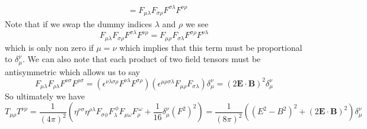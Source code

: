 \documentclass[11pt]{article}
\numberwithin{equation}{section}
\begin{document}
\begin{enumerate}[(a)]
\begin{align*}
                                                                                                             &= F_{\mu\lambda}F_{\sigma\rho}F^{\sigma\lambda}F^{\nu\rho}
    \end{align*}
    Note that if we swap the dummy indices $\lambda$ and $\rho$ we see
    $$F_{\mu\lambda}F_{\sigma\rho}F^{\sigma\lambda}F^{\nu\rho} = F_{\mu\rho}F_{\sigma\lambda}F^{\sigma\rho}F^{\nu\lambda}$$
    which is only non zero if $\mu=\nu$ which implies that this term must be proportional to $\delta^{\nu}_{\mu}$. We 
    can also note that each product of two field tensors must be antisymmetric which allows us to say
    $$F_{\mu\lambda}F_{\rho\lambda}F^{\nu\sigma}F^{\rho\sigma} = \left(\epsilon^{\nu\lambda\sigma\rho}F^{\nu\lambda}F^{\sigma\rho}\right)\left(\epsilon^{\mu\rho\sigma\lambda}F_{\mu\rho}F_{\sigma\lambda}\right)\delta^{\nu}_{\mu} = (2\mathbf{E}\cdot\mathbf{B})^2\delta^{\nu}_{\mu}$$
    So ultimately we have
    $$T_{\mu\rho}T^{\nu\rho} = \frac{1}{(4\pi)^2}\left(\eta^{\nu\sigma}\eta^{\rho\lambda}F_{\sigma\phi}F_{\lambda}^{\ \phi}F_{\mu\omega}F^{\ \omega}_{\rho} + \frac{1}{16}\delta^{\nu}_{\mu}(F^2)^2\right) = \frac{1}{(8\pi)^2}\left((E^2-B^2)^2+(2\mathbf{E}\cdot\mathbf{B})^2\right)\delta^{\nu}_{\mu}$$






\end{enumerate}

\pagebreak
\end{document}
